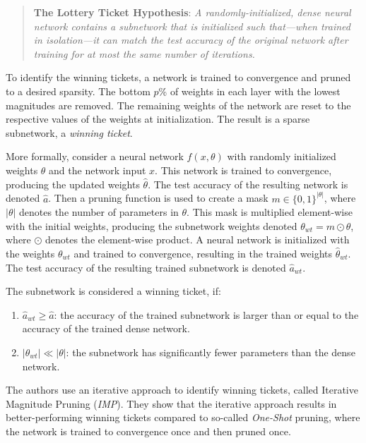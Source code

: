\begin{quote}
    \textbf{The Lottery Ticket Hypothesis}: \textit{A randomly-initialized, dense neural network contains a subnetwork that is initialized such that—when trained in isolation—it can match the test accuracy of the original network after training for at most the same number of iterations.}~\cite{LTH}
\end{quote}

To identify the winning tickets, a network is trained to convergence and pruned to a desired sparsity. 
The bottom $p$\% of weights in each layer with the lowest magnitudes are removed. 
The remaining weights of the network are reset to the respective values of the weights at initialization.
The result is a sparse subnetwork, a \textit{winning ticket}.

More formally, consider a neural network $f(x, \theta)$ with randomly initialized weights $\theta$ and the network input $x$.
This network is trained to convergence, producing the updated weights $\hat \theta$. The test accuracy of the resulting network is denoted $\hat a$.
Then a pruning function is used to create a mask $m \in \{0,1\}^{|\theta|}$, where $|\theta|$ denotes the number of parameters in $\theta$.
This mask is multiplied element-wise with the initial weights, producing the subnetwork weights denoted $\theta_{wt} = m \odot \theta$, where $\odot$ denotes the element-wise product.
A neural network is initialized with the weights $\theta_{wt}$ and trained to convergence, resulting in the trained weights $\hat \theta_{wt}$. 
The test accuracy of the resulting trained subnetwork is denoted $\hat a_{wt}$.

The subnetwork is considered a winning ticket, if:
\begin{enumerate}
  \item  $\hat a_{wt} \geq \hat a$:  the accuracy of the trained subnetwork is larger than or equal to the accuracy of the trained dense network.
  \item $|\theta_{wt}| \ll |\theta|$: the subnetwork has significantly fewer parameters than the dense network.
\end{enumerate}

The authors use an iterative approach to identify winning tickets, called Iterative Magnitude Pruning (\textit{IMP}).
They show that the iterative approach results in better-performing winning tickets compared to so-called \textit{One-Shot} pruning, where the network is trained to convergence once and then pruned once.

